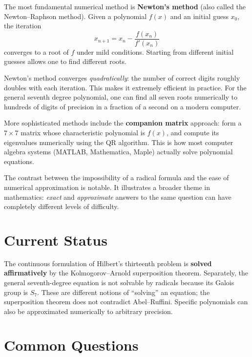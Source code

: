 The most fundamental numerical method is \textbf{Newton's method} (also called the Newton--Raphson method). Given a polynomial $f(x)$ and an initial guess $x_0$, the iteration
\[
    x_{n+1} = x_n - \frac{f(x_n)}{f'(x_n)}
\]
converges to a root of $f$ under mild conditions. Starting from different initial guesses allows one to find different roots.

Newton's method converges \emph{quadratically}: the number of correct digits roughly doubles with each iteration. This makes it extremely efficient in practice. For the general seventh degree polynomial, one can find all seven roots numerically to hundreds of digits of precision in a fraction of a second on a modern computer.

More sophisticated methods include the \textbf{companion matrix} approach: form a $7 \times 7$ matrix whose characteristic polynomial is $f(x)$, and compute its eigenvalues numerically using the QR algorithm. This is how most computer algebra systems (MATLAB, Mathematica, Maple) actually solve polynomial equations.

The contrast between the impossibility of a radical formula and the ease of numerical approximation is notable. It illustrates a broader theme in mathematics: \emph{exact} and \emph{approximate} answers to the same question can have completely different levels of difficulty.

\section{Current Status}

\begin{solvedbox}
The continuous formulation of Hilbert's thirteenth problem is \textbf{solved affirmatively} by the Kolmogorov--Arnold superposition theorem. Separately, the general seventh-degree equation is not solvable by radicals because its Galois group is $S_7$. These are different notions of ``solving'' an equation; the superposition theorem does not contradict Abel--Ruffini. Specific polynomials can also be approximated numerically to arbitrary precision.
\end{solvedbox}

\section*{Common Questions}

